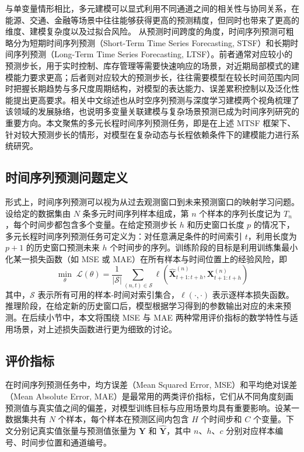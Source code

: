 与单变量情形相比，多元建模可以显式利用不同通道之间的相关性与协同关系，在能源、交通、金融等场景中往往能够获得更高的预测精度，但同时也带来了更高的维度、建模复杂度以及过拟合风险。 从预测时间跨度的角度，时间序列预测可粗略分为短期时间序列预测（Short-Term Time Series Forecasting, STSF）和长期时间序列预测（Long-Term Time Series Forecasting, LTSF）。前者通常对应较小的预测步长，用于实时控制、库存管理等需要快速响应的场景，对近期局部模式的建模能力要求更高；后者则对应较大的预测步长，往往需要模型在较长时间范围内同时把握长期趋势与多尺度周期结构，对模型的表达能力、误差累积控制以及泛化性能提出更高要求。相关中文综述也从时空序列预测与深度学习建模两个视角梳理了该领域的发展脉络，也说明多变量关联建模与复杂场景预测已成为时间序列研究的重要方向\cite{liu2021spatiotemporalcn}。本文聚焦的多元长程时间序列预测任务，即是在上述 MTSF 框架下、针对较大预测步长的情形，对模型在复杂动态与长程依赖条件下的建模能力进行系统研究。 \subsection{时间序列预测问题定义} 形式上，时间序列预测可以视为从过去观测窗口到未来预测窗口的映射学习问题。设给定的数据集由 $N$ 条多元时间序列样本组成，第 $n$ 个样本的序列长度记为 $T_n$，每个时间步都包含多个变量。在给定预测步长 $h$ 和历史窗口长度 $p$ 的情况下，多元长程时间序列预测任务可定义为：对任意满足条件的时间索引 $t$，利用长度为 $p+1$ 的历史窗口预测未来 $h$ 个时间步的序列。训练阶段的目标是利用训练集最小化某一损失函数（如 MSE 或 MAE）在所有样本与时间位置上的经验风险，即 \begin{equation}
\min_{\theta} \; \mathcal{L}(\theta) = \frac{1}{|\mathcal{S}|} \sum_{(n,t)\in \mathcal{S}} \ell\!\left(\hat{\mathbf{X}}^{(n)}_{t+1:t+h}, \mathbf{X}^{(n)}_{t+1:t+h}\right)
\label{eq:chap2-06}
\end{equation}
其中，$\mathcal{S}$ 表示所有可用的样本-时间对索引集合，$\ell(\cdot,\cdot)$ 表示逐样本损失函数。推理阶段，在给定新的历史窗口后，模型根据学习得到的参数输出对应的未来预测。在后续小节中，本文将围绕 MSE 与 MAE 两种常用评价指标的数学特性与适用场景，对上述损失函数进行更为细致的讨论。
\subsection{评价指标}
在时间序列预测任务中，均方误差（Mean Squared Error, MSE）和平均绝对误差（Mean Absolute Error, MAE）是最常用的两类评价指标，它们从不同角度刻画预测值与真实值之间的偏差，对模型训练目标与应用场景均具有重要影响\cite{hyndman2006accuracy,chai2014rmsemae}。设某一数据集共有 $N$ 个样本，每个样本在预测区间内包含 $H$ 个时间步和 $C$ 个变量。下文分别记真实值张量与预测值张量为 $\mathbf{Y}$ 和 $\hat{\mathbf{Y}}$，其中 $n$、$h$、$c$ 分别对应样本编号、时间步位置和通道编号。

